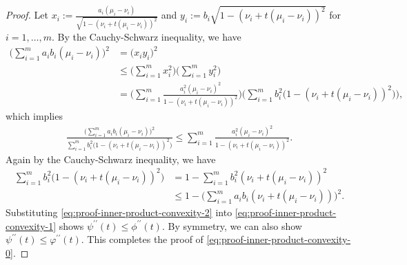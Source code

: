 \documentclass[10pt,a4paper]{amsart}
\begin{document}
\begin{proof}
Let $x_i := \frac{a_i(\mu_i-\nu_i)}{\sqrt{1-(\nu_i+t(\mu_i-\nu_i))^2}}$ and $y_i:= b_i \sqrt{1-(\nu_i + t(\mu_i-\nu_i))^2}$ for $i=1,\ldots,m$.
By the Cauchy-Schwarz inequality, we have
\begin{align*}
\bigg( \sum_{i=1}^m a_i b_i (\mu_i-\nu_i) \bigg)^2 &= \bigg( x_i y_i\bigg)^2 \\
&\le \bigg( \sum_{i=1}^m x_i^2 \bigg)\bigg( \sum_{i=1}^m y_i^2\bigg) \\
&= \bigg( \sum_{i=1}^m \frac{a_i^2 (\mu_i-\nu_i)^2}{1- (\nu_i +t(\mu_i-\nu_i))^2} \bigg) 
 \bigg( \sum_{i=1}^m b_i^2 \big(1- (\nu_i + t(\mu_i-\nu_i))^2\big) \bigg),
\end{align*}
which implies 
\begin{align}
\frac{\big(\sum_{i=1}^m a_i b_i (\mu_i - \nu_i)\big)^2}{\sum_{i=1}^m b_i^2\big(1 - (\nu_i + t(\mu_i-\nu_i))^2 \big)} 
 \le \sum_{i=1}^m \frac{a_i^2 (\mu_i - \nu_i)^2}{1 - (\nu_i + t(\mu_i-\nu_i))^2}. \label{eq:proof-inner-product-convexity-1}
\end{align}
Again by the Cauchy-Schwarz inequality, we have
\begin{align}
\sum_{i=1}^m b_i^2 \big( 1- (\nu_i + t(\mu_i-\nu_i))^2 \big) &= 1 - \sum_{i=1}^m b_i^2 (\nu_i + t(\mu_i-\nu_i))^2 \nonumber \\
&\le 1 - \bigg( \sum_{i=1}^m a_i b_i (\nu_i + t(\mu_i-\nu_i)) \bigg)^2. \label{eq:proof-inner-product-convexity-2}
\end{align}
Substituting \eqref{eq:proof-inner-product-convexity-2} into \eqref{eq:proof-inner-product-convexity-1} shows 
$\psi^{\prime\prime}(t) \le \phi^{\prime\prime}(t)$. By symmetry, we can also show $\psi^{\prime\prime}(t) \le \varphi^{\prime\prime}(t)$.
This completes the proof of \eqref{eq:proof-inner-product-convexity-0}.
\end{proof}
\end{document}
